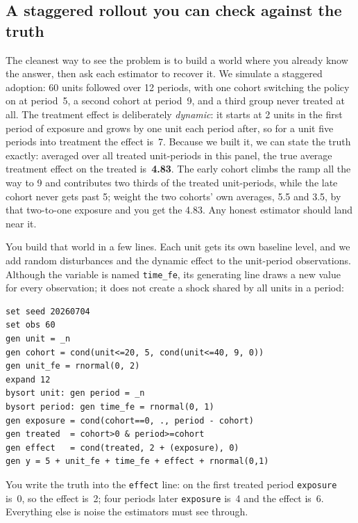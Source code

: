 \subsection{A staggered rollout you can check against the truth}
The cleanest way to see the problem is to build a world where you already know the answer, then ask each estimator to recover it. We simulate a staggered adoption: 60 units followed over 12 periods, with one cohort switching the policy on at period~5, a second cohort at period~9, and a third group never treated at all. The treatment effect is deliberately \emph{dynamic}: it starts at 2 units in the first period of exposure and grows by one unit each period after, so for a unit five periods into treatment the effect is~7. Because we built it, we can state the truth exactly: averaged over all treated unit-periods in this panel, the true average treatment effect on the treated is~\textbf{4.83}. The early cohort climbs the ramp all the way to 9 and contributes two thirds of the treated unit-periods, while the late cohort never gets past 5; weight the two cohorts' own averages, 5.5 and 3.5, by that two-to-one exposure and you get the 4.83. Any honest estimator should land near it.

You build that world in a few lines. Each unit gets its own baseline level, and we add random disturbances and the dynamic effect to the unit-period observations. Although the variable is named \texttt{time\_fe}, its generating line draws a new value for every observation; it does not create a shock shared by all units in a period:
\par
{\footnotesize
\begin{verbatim}
set seed 20260704
set obs 60
gen unit = _n
gen cohort = cond(unit<=20, 5, cond(unit<=40, 9, 0))
gen unit_fe = rnormal(0, 2)
expand 12
bysort unit: gen period = _n
bysort period: gen time_fe = rnormal(0, 1)
gen exposure = cond(cohort==0, ., period - cohort)
gen treated  = cohort>0 & period>=cohort
gen effect   = cond(treated, 2 + (exposure), 0)
gen y = 5 + unit_fe + time_fe + effect + rnormal(0,1)
\end{verbatim}
}
You write the truth into the \texttt{effect} line: on the first treated period \texttt{exposure} is~0, so the effect is~2; four periods later \texttt{exposure} is~4 and the effect is~6. Everything else is noise the estimators must see through.

